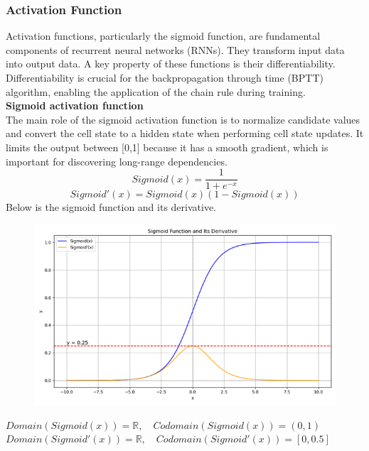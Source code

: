 \documentclass[12pt,a4paper]{article}
\begin{document}
\newpage
\subsubsection{Activation Function}
Activation functions, particularly the sigmoid function, are fundamental components of recurrent neural networks (RNNs). They transform input data into output data. A key property of these functions is their differentiability. Differentiability is crucial for the backpropagation through time (BPTT) algorithm, enabling the application of the chain rule during training. \\[1ex]
\textbf{Sigmoid activation function}
\\[1ex]
The main role of the sigmoid activation function is to normalize candidate values and convert the cell state to a hidden state when performing cell state updates. It limits the output between [0,1] because it has a smooth gradient, which is important for discovering long-range dependencies.\\[1ex]
\begin{equation}
    Sigmoid(x) = \frac{ 1 }{ 1+e^{-x} }
\end{equation}
\begin{equation}
    Sigmoid'(x) = Sigmoid(x)(1-Sigmoid(x))
\end{equation}
Below is the sigmoid function and its derivative.
\begin{figure}[!htb]
    \centering
    \includegraphics[width=1\textwidth]{../Pic/sigmoid.png} %
    \label{fig:sigmoid}
\end{figure}
\newline
$Domain(Sigmoid(x))=\mathbb{R},\hspace{1em} Codomain(Sigmoid(x))=(0,1)$\\
$Domain(Sigmoid'(x))=\mathbb{R},\hspace{1em} Codomain(Sigmoid'(x))=[0,0.5]$
\end{document}
